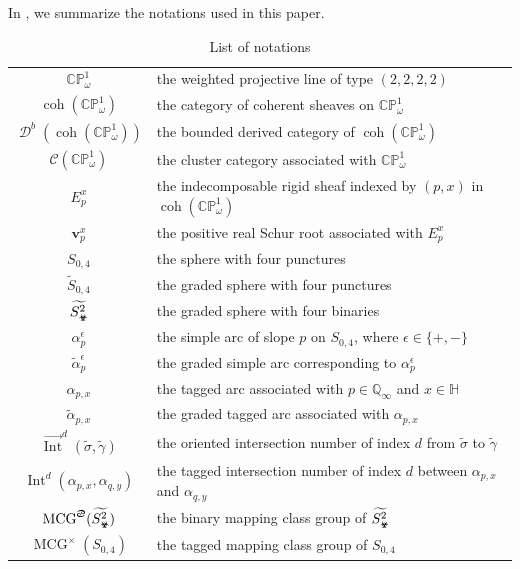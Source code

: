 \documentclass[11pt,a4paper,reqno]{amsart}%
\theoremstyle{plain}
\theoremstyle{definition}
\numberwithin{equation}{section}
\numberwithin{equation}{section}
\newcommand{\QQi}{\mathbb{Q}_\infty}
\newcommand{\Int}{\operatorname{Int}\nolimits}
\newcommand{\D}{\operatorname{\mathcal{D}}}
\newcommand{\oInt}{\overrightarrow{\operatorname{Int}}}
\def\wt{\omega}
\newcommand{\bv}{\mathbf{v}}
\def\x{_\vot}
\newcommand{\MCG}{\operatorname{MCG}}
\def\coh{\operatorname{coh}}
\def\A{\mathbf{A}}
\def\coh{\operatorname{coh}}
\def\CPone{\mathbb{CP}^1_{\wt}}
\newcommand\DC[1]{\D^b(\coh(#1))}
\def\CCP{\mathcal{C}(\CPone)}
\def\TA{\mathbf{T}\mathbf{A}}
\def\wA{\widetilde{\A}}
\newcommand{\bfH}{\mathbb{H}}
\def\vot{\text{\Biohazard}}
\def\sx{\text{\Cancer}}
\begin{document}
In , we summarize the notations used in this paper.
\begin{center}
\begin{table}[htbp]
\caption{List of notations}\label{tab_1}
\centering
\renewcommand{\arraystretch}{1.15}
\begin{tabular}{c@{\qquad}p{}}
\hline
$\CPone$ & the weighted projective line of type $(2,2,2,2)$\\
$\coh(\CPone)$ & the category of coherent sheaves on $\CPone$\\
$\DC{\CPone}$ & the bounded derived category of $\coh(\CPone)$\\
$\CCP$ & the cluster category associated with $\CPone$\\
$E_p^x$ & the indecomposable rigid sheaf indexed by $(p,x)$ in $\coh(\CPone)$\\
$\bv_p^x$ & the positive real Schur root associated with $E_p^x$\\
$S_{0,4}$ & the sphere with four punctures\\
$\widetilde{S}_{0,4}$ & the graded sphere with four punctures\\
$\widetilde{S\x^2}$ & the graded sphere with four binaries\\
$\alpha_p^\epsilon$ & the simple arc of slope $p$ on $S_{0,4}$, where $\epsilon\in\{+,-\}$\\
$\widetilde{\alpha}_p^\epsilon$ & the graded simple arc corresponding to $\alpha_p^\epsilon$\\
$\alpha_{p,x}$ & the tagged arc associated with $p\in\QQi$ and $x\in\bfH$\\
$\widetilde{\alpha}_{p,x}$ & the graded tagged arc associated with $\alpha_{p,x}$\\
$\oInt^d(\widetilde{\sigma},\widetilde{\gamma})$ & the oriented intersection number  of index $d$ from $\widetilde{\sigma}$ to $\widetilde{\gamma}$\\
$\Int^d(\alpha_{p,x},\alpha_{q,y})$ & the tagged intersection number of index $d$ between $\alpha_{p,x}$ and $\alpha_{q,y}$\\
$\MCG^\sx(\widetilde{S\x^2})$ & the binary mapping class group of $\widetilde{S\x^2}$\\
$\MCG^\times(S_{0,4})$ & the tagged mapping class group of $S_{0,4}$\\
\hline
\end{tabular}
\end{table}
\end{center}
\end{document}
